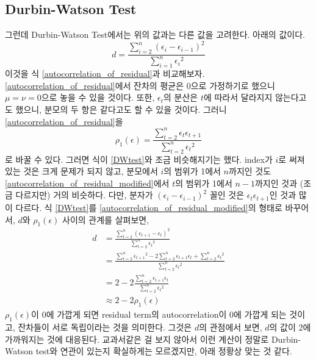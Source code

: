 \documentclass{article}
\begin{document}
\subsection{Durbin-Watson Test}
그런데 Durbin-Watson Test에서는 위의 값과는 다른 값을 고려한다.
아래의 값이다.
\begin{equation}\label{DWtest}
d = \frac{\sum_{i=2}^n(\epsilon_i-\epsilon_{i-1})^2}{\sum_{i=1}^n{\epsilon_i}^2}
\end{equation}
이것을 식 \eqref{autocorrelation_of_residual}과 비교해보자.
\eqref{autocorrelation_of_residual}에서 잔차의 평균은 0으로 가정하기로 했으니 \(\mu=\nu=0\)으로 놓을 수 있을 것이다.
또한, \(\epsilon_t\)의 분산은 \(t\)에 따라서 달라지지 않는다고도 했으니, 분모의 두 항은 같다고도 할 수 있을 것이다.
그러니 \eqref{autocorrelation_of_residual}을
\begin{equation}\label{autocorrelation_of_residual_modified}
\rho_1(\epsilon)=\frac{\sum_{t=2}^n\epsilon_t\epsilon_{t+1}}{\sum_{t=2}^n{\epsilon_t}^2}
\end{equation}
로 바꿀 수 있다.
그러면 식이 \eqref{DWtest}와 조금 비슷해지기는 했다.
index가 $i$로 써져있는 것은 크게 문제가 되지 않고, 분모에서 $i$의 범위가 1에서 \(n\)까지인 것도 \eqref{autocorrelation_of_residual_modified}에서 $t$의 범위가 1에서 \(n-1\)까지인 것과 (조금 다르지만) 거의 비슷하다.
다만, 분자가 \((\epsilon_i-\epsilon_{i-1})^2\) 꼴인 것은 \(\epsilon_t\epsilon_{t+1}\)인 것과 많이 다르다.
식 \eqref{DWtest}를 \eqref{autocorrelation_of_residual_modified}의 형태로 바꾸어서, \(d\)와 \(\rho_1(\epsilon)\) 사이의 관계를 살펴보면,
\begin{equation}\label{relation_between_d_and_rho}
\begin{aligned}
d
&=\frac{\sum_{t=2}^n(\epsilon_{t+1}-\epsilon_t)^2}{\sum_{t=2}^n{\epsilon_t}^2}\\
&=\frac{\sum_{t=2}^n{\epsilon_{t+1}}^2-2\sum_{t=2}^n\epsilon_{t+1}\epsilon_t+\sum_{t=2}^n{\epsilon_t}^2}{\sum_{t=2}^n{\epsilon_t}^2}\\
&=2-2\frac{\sum_{t=2}^n\epsilon_{t+1}\epsilon_t}{\sum_{t=2}^n{\epsilon_t}^2}\\
&\approx 2-2\rho_1(\epsilon)
\end{aligned}
\end{equation}
\(\rho_1(\epsilon)\)이 0에 가깝게 되면 residual term의 autocorrelation이 0에 가깝게 되는 것이고, 잔차들이 서로 독립이라는 것을 의미한다.
그것은 \(d\)의 관점에서 보면, \(d\)의 값이 2에 가까워지는 것에 대응된다.
교과서같은 걸 보지 않아서 이런 계산이 정말로 Durbin-Watson test와 연관이 있는지 확실하게는 모르겠지만, 아래 정황상 맞는 것 같다.
\end{document}
